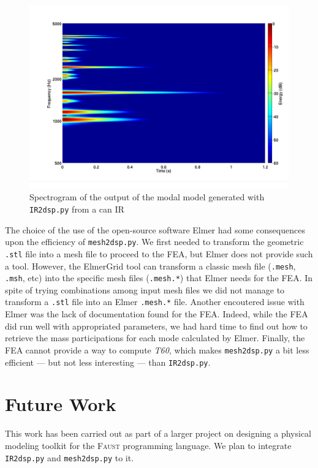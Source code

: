 \documentclass[11pt,a4paper]{article}
\newcommand{\f}{\textsc{Faust}}
\begin{document}
\begin{figure}[htbp]
  \centering
  \includegraphics[width=\columnwidth]{pictures/canModalModel.pdf}
  \caption{Spectrogram of the output of the modal model generated with \texttt{IR2dsp.py} from a can IR}
  \label{fig:spectro2}
\end{figure}

The choice of the use of the open-source software Elmer had some consequences upon the efficiency of \texttt{mesh2dsp.py}. We first needed to transform the geometric \texttt{.stl} file into a mesh file to proceed to the FEA, but Elmer does not provide such a tool. However, the ElmerGrid tool can transform a classic mesh file (\texttt{.mesh}, \texttt{.msh}, etc) into the specific mesh files (\texttt{.mesh.*}) that Elmer needs for the FEA. In spite of trying combinations among input mesh files we did not manage to transform a \texttt{.stl} file into an Elmer \texttt{.mesh.*} file.
Another encoutered issue with Elmer was the lack of documentation found for the FEA. Indeed, while the FEA did run well with appropriated parameters, we had hard time to find out how to retrieve the mass participations for each mode calculated by Elmer. Finally, the FEA cannot provide a way to compute \textit{T60}, which makes \texttt{mesh2dsp.py} a bit less efficient --- but not less interesting --- than \texttt{IR2dsp.py}.

\section{Future Work}
\label{sec:future}

This work has been carried out as part of a larger project on designing a physical modeling toolkit for the \f{} programming language. We plan to integrate \texttt{IR2dsp.py} and \texttt{mesh2dsp.py} to it.
\end{document}
